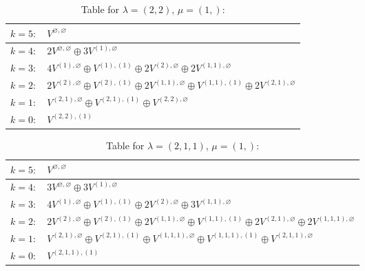 \documentclass[a4paper,12pt]{article}
\begin{document}
\renewcommand{\arraystretch}{1.6} 
\begin{table}[H]
\centering
\caption{Table for $\lambda = (2, 2)$, $\mu = (1,)$:}
\begin{tabular}{|>{\centering\arraybackslash}p{15cm}|}
\hline
 $k = 5: \quad V^{\varnothing, \varnothing} $ \\ \hline
 $k = 4: \quad 2 V^{\varnothing, \varnothing} \oplus 3 V^{(1), \varnothing} $ \\ \hline
 $k = 3: \quad 4 V^{(1), \varnothing} \oplus V^{(1), (1)} \oplus 2 V^{(2), \varnothing} \oplus 2 V^{(1, 1), \varnothing} $ \\ \hline
 $k = 2: \quad 2 V^{(2), \varnothing} \oplus V^{(2), (1)} \oplus 2 V^{(1, 1), \varnothing} \oplus V^{(1, 1), (1)} \oplus 2 V^{(2, 1), \varnothing} $ \\ \hline
 $k = 1: \quad V^{(2, 1), \varnothing} \oplus V^{(2, 1), (1)} \oplus V^{(2, 2), \varnothing} $ \\ \hline
 $k = 0: \quad V^{(2, 2), (1)} $ \\ \hline
\end{tabular}
\end{table}

\renewcommand{\arraystretch}{1.6} 
\begin{table}[H]
\centering
\caption{Table for $\lambda = (2, 1, 1)$, $\mu = (1,)$:}
\begin{tabular}{|>{\centering\arraybackslash}p{15cm}|}
\hline
 $k = 5: \quad V^{\varnothing, \varnothing} $ \\ \hline
 $k = 4: \quad 3 V^{\varnothing, \varnothing} \oplus 3 V^{(1), \varnothing} $ \\ \hline
 $k = 3: \quad 4 V^{(1), \varnothing} \oplus V^{(1), (1)} \oplus 2 V^{(2), \varnothing} \oplus 3 V^{(1, 1), \varnothing} $ \\ \hline
 $k = 2: \quad 2 V^{(2), \varnothing} \oplus V^{(2), (1)} \oplus 2 V^{(1, 1), \varnothing} \oplus V^{(1, 1), (1)} \oplus 2 V^{(2, 1), \varnothing} \oplus 2 V^{(1, 1, 1), \varnothing} $ \\ \hline
 $k = 1: \quad V^{(2, 1), \varnothing} \oplus V^{(2, 1), (1)} \oplus V^{(1, 1, 1), \varnothing} \oplus V^{(1, 1, 1), (1)} \oplus V^{(2, 1, 1), \varnothing} $ \\ \hline
 $k = 0: \quad V^{(2, 1, 1), (1)} $ \\ \hline
\end{tabular}
\end{table}
\end{document}
